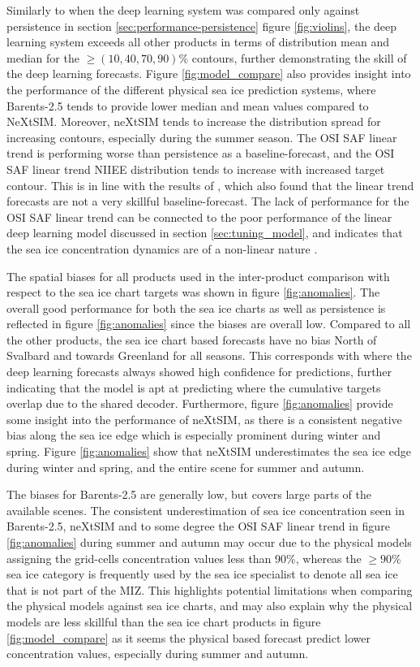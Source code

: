 \documentclass[../main/thesis]{subfiles}
\begin{document}
Similarly to when the deep learning system was compared only against persistence in section \ref{sec:performance-persistence} figure \ref{fig:violins}, the deep learning system exceeds all other products in terms of distribution mean and median for the $\geq(10, 40, 70, 90)\%$ contours, further demonstrating the skill of the deep learning forecasts. Figure \ref{fig:model_compare} also provides insight into the performance of the different physical sea ice prediction systems, where Barents-2.5 tends to provide lower median and mean values compared to NeXtSIM. Moreover, neXtSIM tends to increase the distribution spread for increasing contours, especially during the summer season. The OSI SAF linear trend is performing worse than persistence as a baseline-forecast, and the OSI SAF linear trend NIIEE distribution tends to increase with increased target contour. This is in line with the results of \citet{Grigoryev2022}, which also found that the linear trend forecasts are not a very skillful baseline-forecast. The lack of performance for the OSI SAF linear trend can be connected to the poor performance of the linear deep learning model discussed in section \ref{sec:tuning_model}, and indicates that the sea ice concentration dynamics are of a non-linear nature \citep{Grigoryev2022}.

The spatial biases for all products used in the inter-product comparison with respect to the sea ice chart targets was shown in figure \ref{fig:anomalies}. The overall good performance for both the sea ice charts as well as persistence is reflected in figure \ref{fig:anomalies} since the biases are overall low. Compared to all the other products, the sea ice chart based forecasts have no bias North of Svalbard and towards Greenland for all seasons. This corresponds with where the deep learning forecasts always showed high confidence for predictions, further indicating that the model is apt at predicting where the cumulative targets overlap due to the shared decoder. Furthermore, figure \ref{fig:anomalies} provide some insight into the performance of neXtSIM, as there is a consistent negative bias along the sea ice edge which is especially prominent during winter and spring. Figure \ref{fig:anomalies} show that neXtSIM underestimates the sea ice edge during winter and spring, and the entire scene for summer and autumn.

The biases for Barents-2.5 are generally low, but covers large parts of the available scenes. The consistent underestimation of sea ice concentration seen in Barents-2.5, neXtSIM and to some degree the OSI SAF linear trend in figure \ref{fig:anomalies} during summer and autumn may occur due to the physical models assigning the grid-cells concentration values less than 90\%, whereas the $\geq90\%$ sea ice category is frequently used by the sea ice specialist to denote all sea ice that is not part of the MIZ. This highlights potential limitations when comparing the physical models against sea ice charts, and may also explain why the physical models are less skillful than the sea ice chart products in figure \ref{fig:model_compare} as it seems the physical based forecast predict lower concentration values, especially during summer and autumn.
\end{document}
